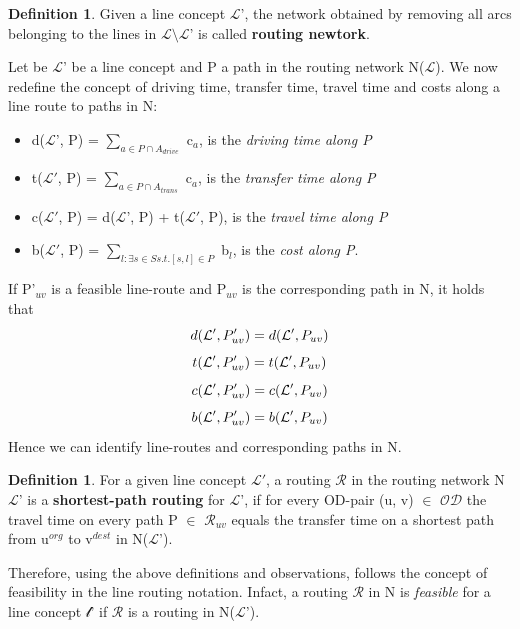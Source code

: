 \documentclass[
  twoside,
  11pt, a4paper,
  footinclude=true,
  headinclude=true,
  cleardoublepage=empty
]{scrbook}
\theoremstyle{definition}
\newtheorem{definition}[theorem]{Definition}
\begin{document}
\begin{definition} Given a line concept $\mathcal{L}$', the network obtained by removing all arcs belonging to the lines in $\mathcal{L}\setminus\mathcal{L}$' is called \textbf{routing newtork}.
\end{definition}
Let be $\mathcal{L}$' be a line concept and P a path in the routing network N($\mathcal{L}$). We now redefine the concept of driving time, transfer time, travel time and costs along a line route to paths in N: 
\begin{itemize}
\item d($\mathcal{L}$', P) = $\sum_{a \in P \cap A_{drive}}$ c$_a$, is the \emph{driving time along P}
\item t($\mathcal{L}'$, P) = $\sum_{a \in P \cap A_{trans}}$ c$_a$, is the \emph{transfer time along P}
\item c($\mathcal{L}'$, P) = d($\mathcal{L}$', P) + t($\mathcal{L}'$, P), is the \emph{travel time along P}
\item b($\mathcal{L}'$, P) = $\sum_{l:\exists s\in S s.t. [s,l]\in P}$ b$_l$, is the \emph{cost along P}.
\end{itemize}
If P'$_{uv}$ is a feasible line-route and P$_{uv}$ is the corresponding path in N, it holds that
\begin{equation} \notag
d(\mathcal{L}', P'_{uv}) = d(\mathcal{L}', P_{uv})
\end{equation} \notag
\begin{equation} \notag
t(\mathcal{L}', P'_{uv}) = t(\mathcal{L}', P_{uv})
\end{equation} \notag
\begin{equation} \notag
c(\mathcal{L}', P'_{uv}) = c(\mathcal{L}', P_{uv})
\end{equation}
\begin{equation} \notag
b(\mathcal{L}', P'_{uv}) = b(\mathcal{L}', P_{uv})
\end{equation}
Hence we can identify line-routes and corresponding paths in N.\newline
\begin{definition} For a given line concept $\mathcal{L}'$, a routing $\mathcal{R}$ in the routing network N$\mathcal{L}$' is a \textbf{shortest-path routing} for $\mathcal{L}$', if for every OD-pair (u, v) $\in$ $\mathcal{OD}$ the travel time on every path P $\in$ $\mathcal{R}_{uv}$ equals the transfer time on a shortest path from u$^{org}$ to v$^{dest}$ in N($\mathcal{L}$').
\end{definition}
Therefore, using the above definitions and observations, follows the concept of feasibility in the line routing notation. Infact, a routing $\mathcal{R}$ in N is \emph{feasible} for a line concept $\mathcal{l}$' if $\mathcal{R}$ is a routing in N($\mathcal{L}$'). \newline
\end{document}
